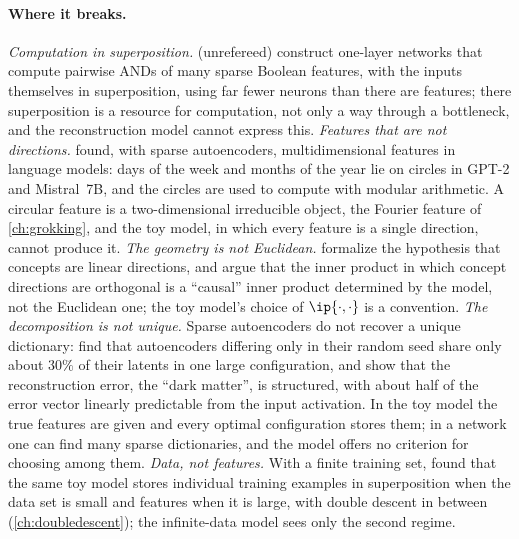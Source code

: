 \begin{refsection}
\paragraph{Where it breaks.} \emph{Computation in superposition.} \Textcite{HanniEtAl2024} (unrefereed) construct one-layer networks that compute pairwise ANDs of many sparse Boolean features, with the inputs themselves in superposition, using far fewer neurons than there are features; there superposition is a resource for computation, not only a way through a bottleneck, and the reconstruction model cannot express this. \emph{Features that are not directions.} \Textcite{EngelsEtAl2025} found, with sparse autoencoders, multidimensional features in language models: days of the week and months of the year lie on circles in GPT-2 and Mistral~7B, and the circles are used to compute with modular arithmetic. A circular feature is a two-dimensional irreducible object, the Fourier feature of \cref{ch:grokking}, and the toy model, in which every feature is a single direction, cannot produce it. \emph{The geometry is not Euclidean.} \Textcite{ParkEtAl2024} formalize the hypothesis that concepts are linear directions, and argue that the inner product in which concept directions are orthogonal is a ``causal'' inner product determined by the model, not the Euclidean one; the toy model's choice of $\ip{\cdot,\cdot}$ is a convention. \emph{The decomposition is not unique.} Sparse autoencoders do not recover a unique dictionary: \textcite{PauloBelrose2025} find that autoencoders differing only in their random seed share only about $30\%$ of their latents in one large configuration, and \textcite{EngelsSmithTegmark2025} show that the reconstruction error, the ``dark matter'', is structured, with about half of the error vector linearly predictable from the input activation. In the toy model the true features are given and every optimal configuration stores them; in a network one can find many sparse dictionaries, and the model offers no criterion for choosing among them. \emph{Data, not features.} With a finite training set, \textcite{HenighanEtAl2023} found that the same toy model stores individual training examples in superposition when the data set is small and features when it is large, with double descent in between (\cref{ch:doubledescent}); the infinite-data model sees only the second regime.


\end{refsection}
